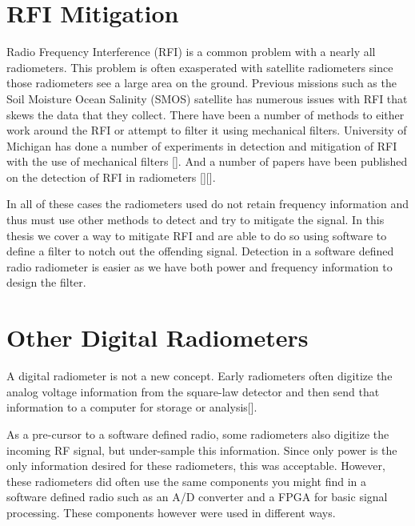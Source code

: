 \section{RFI Mitigation}
Radio Frequency Interference (RFI) is a common problem with a nearly all radiometers.  This problem is often exasperated with satellite radiometers since those radiometers see a large area on the ground.  Previous missions such as the Soil Moisture Ocean Salinity (SMOS) satellite has numerous issues with RFI that skews the data that they collect.  There have been a number of methods to either work around the RFI or attempt to filter it using mechanical filters.  University of Michigan has done a number of experiments in detection and mitigation of RFI with the use of mechanical filters [\cite{DeRooRFI}].  And a number of papers have been published on the detection of RFI in radiometers [\citep{DeRoo}][\cite{Forte}].

In all of these cases the radiometers used do not retain frequency information and thus must use other methods to detect and try to mitigate the signal.  In this thesis we cover a way to mitigate RFI and are able to do so using software to define a filter to notch out the offending signal.  Detection in a software defined radio radiometer is easier as we have both power and frequency information to design the filter.

\section{Other Digital Radiometers}
A digital radiometer is not a new concept.  Early radiometers often digitize the analog voltage information from the square-law detector and then send that information to a computer for storage or analysis[\cite{Ruf}].  

As a pre-cursor to a software defined radio, some radiometers also digitize the incoming RF signal, but under-sample this information.  Since only power is the only information desired for these radiometers, this was acceptable.  However, these radiometers did often use the same components you might find in a software defined radio such as an A/D converter and a FPGA for basic signal processing.  These components however were used in different ways.

